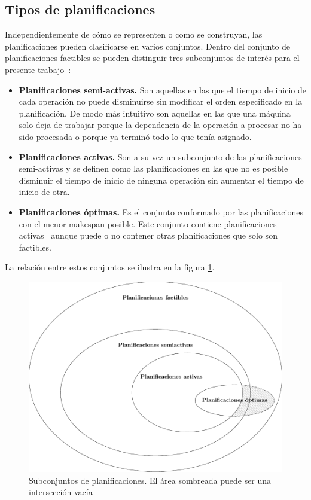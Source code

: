 \subsection{Tipos de planificaciones}
Independientemente de cómo se representen o como se construyan, las planificaciones pueden clasificarse en varios conjuntos. Dentro del conjunto de planificaciones factibles se pueden distinguir tres subconjuntos de interés para el presente trabajo~\cite{sprecher1995semi}:
\begin{itemize}
    \item \textbf{Planificaciones semi-activas.} Son aquellas en las que el tiempo de inicio de cada operación no puede disminuirse sin modificar el orden especificado en la planificación. De modo más intuitivo son aquellas en las que una máquina solo deja de trabajar porque la dependencia de la operación a procesar no ha sido procesada o porque ya terminó todo lo que tenía asignado.
    \item \textbf{Planificaciones activas.} Son a su vez un subconjunto de las planificaciones semi-activas y se definen como las planificaciones en las que no es posible disminuir el tiempo de inicio de ninguna operación sin aumentar el tiempo de inicio de otra. 
    \item \textbf{Planificaciones óptimas.} Es el conjunto conformado por las planificaciones con el menor makespan posible. Este conjunto contiene planificaciones activas~\cite{Ponsich2013} aunque puede o no contener otras planificaciones que solo son factibles.
\end{itemize}

La relación entre estos conjuntos se ilustra en la figura \ref{fig:solspace}. 


\begin{figure}[H]
    \centering
    \includegraphics[scale=.8]{Imagenes/solspace.pdf}
    \caption{Subconjuntos de planificaciones. El área sombreada puede ser una intersección vacía}
    \label{fig:solspace}
\end{figure}

